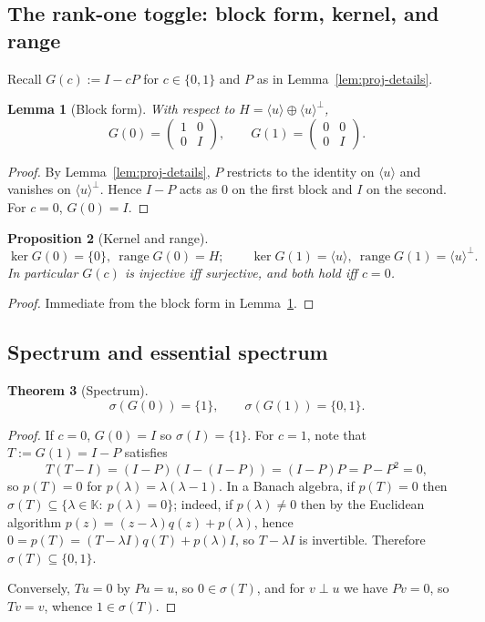 \documentclass[11pt]{article}
\newtheorem{theorem}{Theorem}[section]
\newtheorem{proposition}[theorem]{Proposition}
\newtheorem{lemma}[theorem]{Lemma}
\theoremstyle{definition}
\newcommand{\K}{\mathbb{K}}
\DeclareMathOperator{\range}{range}
\DeclareMathOperator{\kerop}{ker}
\begin{document}
\subsection{The rank-one toggle: block form, kernel, and range}

Recall $G(c):=I-cP$ for $c\in\{0,1\}$ and $P$ as in Lemma~\ref{lem:proj-details}.

\begin{lemma}[Block form]\label{lem:block-human}
With respect to $H=\langle u\rangle\oplus \langle u\rangle^\perp$,
\[
G(0)=\begin{pmatrix}1&0\\[2pt]0&I\end{pmatrix},\qquad
G(1)=\begin{pmatrix}0&0\\[2pt]0&I\end{pmatrix}.
\]
\end{lemma}

\begin{proof}
By Lemma~\ref{lem:proj-details}, $P$ restricts to the identity on $\langle u\rangle$ and vanishes on $\langle u\rangle^\perp$. Hence $I-P$ acts as $0$ on the first block and $I$ on the second. For $c=0$, $G(0)=I$.
\end{proof}

\begin{proposition}[Kernel and range]\label{prop:ker-range-human}
\[
\kerop G(0)=\{0\},\ \range G(0)=H;\qquad
\kerop G(1)=\langle u\rangle,\ \range G(1)=\langle u\rangle^\perp.
\]
In particular $G(c)$ is injective iff surjective, and both hold iff $c=0$.
\end{proposition}

\begin{proof}
Immediate from the block form in Lemma~\ref{lem:block-human}.
\end{proof}

\subsection{Spectrum and essential spectrum}

\begin{theorem}[Spectrum]\label{thm:spectrum-human}
\[
\sigma(G(0))=\{1\},\qquad \sigma(G(1))=\{0,1\}.
\]
\end{theorem}

\begin{proof}
If $c=0$, $G(0)=I$ so $\sigma(I)=\{1\}$. For $c=1$, note that $T:=G(1)=I-P$ satisfies
\[
T(T-I)=(I-P)(I-(I-P))=(I-P)P=P-P^2=0,
\]
so $p(T)=0$ for $p(\lambda)=\lambda(\lambda-1)$. In a Banach algebra, if $p(T)=0$ then $\sigma(T)\subseteq\{\lambda\in\K:\ p(\lambda)=0\}$; indeed, if $p(\lambda)\neq 0$ then by the Euclidean algorithm $p(z)=(z-\lambda)q(z)+p(\lambda)$, hence $0=p(T)=(T-\lambda I)q(T)+p(\lambda)I$, so $T-\lambda I$ is invertible. Therefore $\sigma(T)\subseteq\{0,1\}$.

Conversely, $Tu=0$ by $Pu=u$, so $0\in\sigma(T)$, and for $v\perp u$ we have $Pv=0$, so $Tv=v$, whence $1\in\sigma(T)$.
\end{proof}
\end{document}
